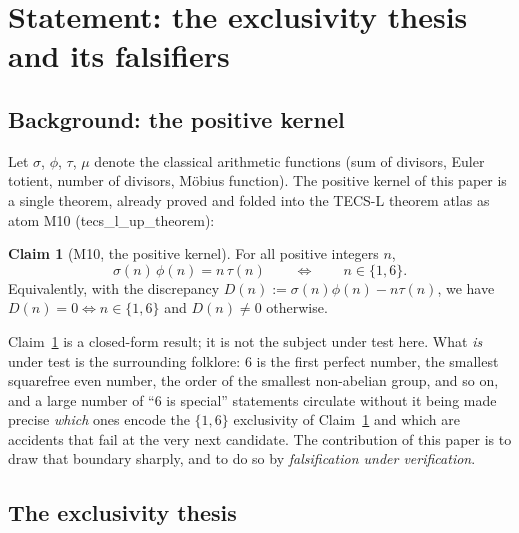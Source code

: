 \documentclass[11pt,a4paper]{article}
\newcommand{\sig}{\sigma}
\newcommand{\Dn}{D(n)}
\theoremstyle{definition}
\newtheorem{claim}{Claim}
\begin{document}
\tableofcontents

\section{Statement: the exclusivity thesis and its falsifiers}
\label{sec:statement}

\subsection{Background: the positive kernel}

Let $\sig$, $\phi$, $\tau$, $\mu$ denote the classical arithmetic functions
(sum of divisors, Euler totient, number of divisors, M\"obius function). The
positive kernel of this paper is a single theorem, already proved and folded
into the TECS-L theorem atlas as atom \textsf{M10}
(\textsf{tecs\_l\_up\_theorem}):

\begin{claim}[M10, the positive kernel]\label{cl:m10}
For all positive integers $n$,
\[
  \sig(n)\,\phi(n) = n\,\tau(n)
  \qquad\Longleftrightarrow\qquad
  n\in\{1,6\}.
\]
Equivalently, with the discrepancy $\Dn:=\sig(n)\phi(n)-n\tau(n)$, we have
$\Dn=0\Leftrightarrow n\in\{1,6\}$ and $\Dn\neq0$ otherwise.
\end{claim}

Claim~\ref{cl:m10} is a closed-form result; it is not the subject under test
here. What \emph{is} under test is the surrounding folklore: $6$ is the first
perfect number, the smallest squarefree even number, the order of the smallest
non-abelian group, and so on, and a large number of ``$6$ is special''
statements circulate without it being made precise \emph{which} ones encode the
$\{1,6\}$ exclusivity of Claim~\ref{cl:m10} and which are accidents that fail at
the very next candidate. The contribution of this paper is to draw that
boundary sharply, and to do so by \emph{falsification under verification}.

\subsection{The exclusivity thesis}
\end{document}
